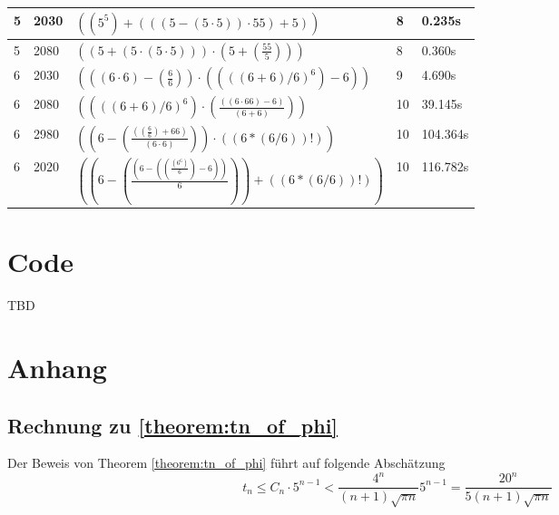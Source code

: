 \documentclass{article}
\theoremstyle{nonumberplain}
\begin{document}
\begin{center}
\begin{longtable}{ | l | l | p{7cm} | l | l | }
                5 & 2030 & \( \left(\left({5}^{5}\right) + \left(\left(\left(5 - \left(5 \cdot 5\right)\right) \cdot 55\right) + 5\right)\right) \) & 8 & 0.235s \\\hline
                5 & 2080 & \( \left(\left(5 + \left(5 \cdot \left(5 \cdot 5\right)\right)\right) \cdot \left(5 + \left(\frac{55}{5}\right)\right)\right) \) & 8 & 0.360s \\\hline
                6 & 2030 & \( \left(\left(\left(6 \cdot 6\right) - \left(\frac{6}{6}\right)\right) \cdot \left(\left({((6 + 6) / 6)}^{6}\right) - 6\right)\right) \) & 9 & 4.690s \\\hline
                6 & 2080 & \( \left(\left({((6 + 6) / 6)}^{6}\right) \cdot \left(\frac{\left(\left(6 \cdot 66\right) - 6\right)}{\left(6 + 6\right)}\right)\right) \) & 10 & 39.145s \\\hline
                6 & 2980 & \( \left(\left(6 - \left(\frac{\left(\left(\frac{6}{6}\right) + 66\right)}{\left(6 \cdot 6\right)}\right)\right) \cdot \left((6 * (6 / 6))!\right)\right) \) & 10 & 104.364s \\\hline
                6 & 2020 & \( \left(\left(6 - \left(\frac{\left(6 - \left(\left(\frac{\left({6}^{6}\right)}{6}\right) - 6\right)\right)}{6}\right)\right) + \left((6 * (6 / 6))!\right)\right) \) & 10 & 116.782s \\\hline
    \end{longtable}
\end{center}

\section{Code}

TBD

\section{Anhang}

\subsection{Rechnung zu \ref{theorem:tn_of_phi}}

Der Beweis von Theorem \ref{theorem:tn_of_phi} führt auf folgende Abschätzung
    \[t_n \leq C_n \cdot 5^{n-1} < \frac{4^n}{(n+1)\sqrt{\pi n}} 5^{n-1} =  \frac{20^n}{5(n+1)\sqrt{\pi n}}\]
\end{document}
